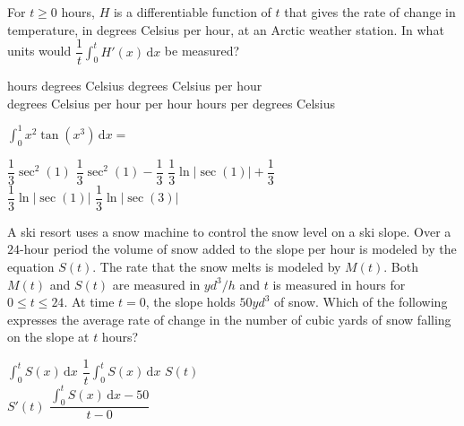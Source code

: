 \begin{questions}
    \newpage

    \question For $t \geq 0$ hours, $H$ is a differentiable function of $t$ that gives the rate of change in temperature, in degrees Celsius per hour, at an Arctic weather station. In what units would $\dfrac{1}{t}\int_0^t H'(x) \,\mathrm{d}x$ be measured? \\

    \begin{oneparchoices}
        \choice hours
        \choice degrees Celsius
        \choice degrees Celsius per hour \\[11pt]
        \makebox[0.07\textwidth] \choice degrees Celsius per hour per hour
        \makebox[0.20\textwidth] \choice hours per degrees Celsius
    \end{oneparchoices} \par \horizontalline

    \question $\int_0^1 x^2\tan \left(x^3\right) \,\mathrm{d}x = $ \\

    \begin{oneparchoices}
        \choice $\dfrac{1}{3}\sec^2 (1)$
        \choice $\dfrac{1}{3}\sec^2 (1) - \dfrac{1}{3}$
        \choice $\dfrac{1}{3}\ln |\sec (1)| + \dfrac{1}{3}$ \\[11pt]
        \makebox[0.23\textwidth] \choice $\dfrac{1}{3}\ln |\sec (1)|$
        \makebox[0.26\textwidth] \choice $\dfrac{1}{3}\ln |\sec (3)|$
    \end{oneparchoices} \par \horizontalline

    \question A ski resort uses a snow machine to control the snow level on a ski slope. Over a $24$-hour period the volume of snow added to the slope per hour is modeled by the equation $S(t)$. The rate that the snow melts is modeled by $M(t)$. Both $M(t)$ and $S(t)$ are measured in $\si{yd^3 \per h}$ and $t$ is measured in hours for $0 \leq t \leq 24$. At time $t = 0$, the slope holds $50 \si{yd^3}$ of snow. Which of the following expresses the average rate of change in the number of cubic yards of snow falling on the slope at $t$ hours? \\

    \begin{oneparchoices}
        \choice $\int_0^t S(x) \,\mathrm{d}x$
        \choice $\dfrac{1}{t}\int_0^t S(x) \,\mathrm{d}x$
        \choice $S(t)$ \\[11pt]
        \makebox[0.25\textwidth] \choice $S'(t)$
        \makebox[0.25\textwidth] \choice $\dfrac{\displaystyle\int_0^t S(x) \,\mathrm{d}x - 50}{t - 0}$
    \end{oneparchoices} \par \horizontalline


\end{questions}
